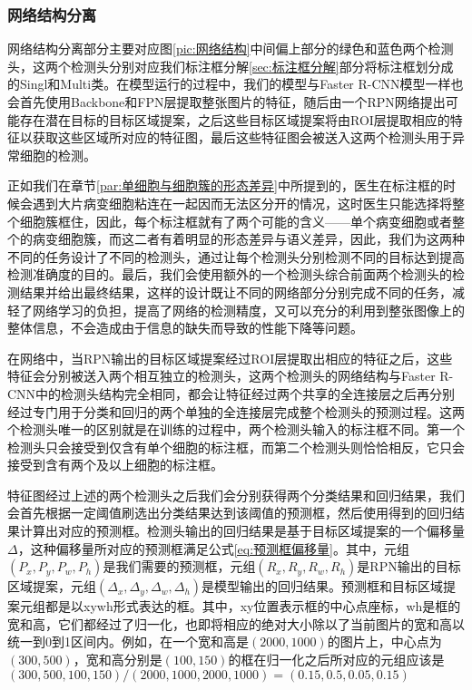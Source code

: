 \subsubsection{网络结构分离}
\par 网络结构分离部分主要对应图\ref{pic:网络结构}中间偏上部分的绿色和蓝色两个检测头，这两个检测头分别对应我们标注框分解\ref{sec:标注框分解}部分将标注框划分成的Singl和Multi类。在模型运行的过程中，我们的模型与Faster R-CNN模型一样也会首先使用Backbone和FPN层提取整张图片的特征，随后由一个RPN网络提出可能存在潜在目标的目标区域提案，之后这些目标区域提案将由ROI层提取相应的特征以获取这些区域所对应的特征图，最后这些特征图会被送入这两个检测头用于异常细胞的检测。
\par 正如我们在章节\ref{par:单细胞与细胞簇的形态差异}中所提到的，医生在标注框的时候会遇到大片病变细胞粘连在一起因而无法区分开的情况，这时医生只能选择将整个细胞簇框住，因此，每个标注框就有了两个可能的含义——单个病变细胞或者整个的病变细胞簇，而这二者有着明显的形态差异与语义差异，因此，我们为这两种不同的任务设计了不同的检测头，通过让每个检测头分别检测不同的目标达到提高检测准确度的目的。最后，我们会使用额外的一个检测头综合前面两个检测头的检测结果并给出最终结果，这样的设计既让不同的网络部分分别完成不同的任务，减轻了网络学习的负担，提高了网络的检测精度，又可以充分的利用到整张图像上的整体信息，不会造成由于信息的缺失而导致的性能下降等问题。
\par 在网络中，当RPN输出的目标区域提案经过ROI层提取出相应的特征之后，这些特征会分别被送入两个相互独立的检测头，这两个检测头的网络结构与Faster R-CNN中的检测头结构完全相同，都会让特征经过两个共享的全连接层之后再分别经过专门用于分类和回归的两个单独的全连接层完成整个检测头的预测过程。这两个检测头唯一的区别就是在训练的过程中，两个检测头输入的标注框不同。第一个检测头只会接受到仅含有单个细胞的标注框，而第二个检测头则恰恰相反，它只会接受到含有两个及以上细胞的标注框。
\par 特征图经过上述的两个检测头之后我们会分别获得两个分类结果和回归结果，我们会首先根据一定阈值刷选出分类结果达到该阈值的预测框，然后使用得到的回归结果计算出对应的预测框。检测头输出的回归结果是基于目标区域提案的一个偏移量$\Delta$，这种偏移量所对应的预测框满足公式\ref{eq:预测框偏移量}。其中，元组$(P_x, P_y, P_w, P_h)$是我们需要的预测框，元组$(R_x, R_y, R_w, R_h)$是RPN输出的目标区域提案，元组$(\Delta_x, \Delta_y, \Delta_w, \Delta_h)$是模型输出的回归结果。预测框和目标区域提案元组都是以xywh形式表达的框。其中，xy位置表示框的中心点座标，wh是框的宽和高，它们都经过了归一化，也即将相应的绝对大小除以了当前图片的宽和高以统一到0到1区间内。例如，在一个宽和高是$(2000, 1000)$的图片上，中心点为$(300, 500)$，宽和高分别是$(100,150)$的框在归一化之后所对应的元组应该是$(300, 500, 100, 150) / (2000, 1000, 2000, 1000) = (0.15, 0.5, 0.05, 0.15)$
